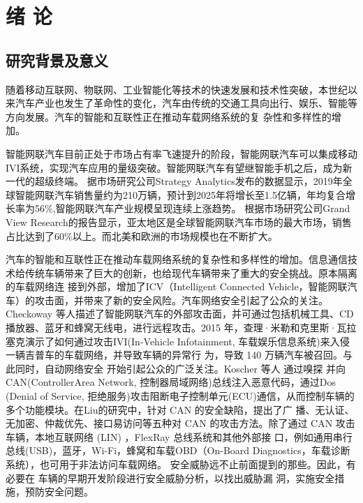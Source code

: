 \chapter{绪\hskip 0.4cm 论}
\label{ch1}
\section{研究背景及意义}
随着移动互联网、物联网、工业智能化等技术的快速发展和技术性突破，本世纪以来汽车产业也发生了革命性的变化，汽车由传统的交通工具向出行、娱乐、智能等方向发展。汽车的智能和互联性正在推动车载网络系统的复
杂性和多样性的增加。

智能网联汽车目前正处于市场占有率飞速提升的阶段，智能网联汽车可以集成移动IVI系统，实现汽车应用的量级突破。智能网联汽车有望继智能手机之后，成为新一代的超级终端。
据市场研究公司Strategy Analytics发布的数据\cite{strategy_analytics_2020}显示，2019年全球智能网联汽车销售量约为210万辆，预计到2025年将增长至1.5亿辆，年均复合增长率为56\%,智能网联汽车产业规模呈现连续上涨趋势。
根据市场研究公司Grand View Research的报告显示\cite{grand_view_research_2020}，亚太地区是全球智能网联汽车市场的最大市场，销售占比达到了60\%以上。而北美和欧洲的市场规模也在不断扩大。

汽车的智能和互联性正在推动车载网络系统的复杂性和多样性的增加。信息通信技术给传统车辆带来了巨大的创新，也给现代车辆带来了重大的安全挑战。原本隔离的车载网络连
接到外部，增加了ICV（Intelligent Connected Vehicle，智能网联汽车）的攻击面，并带来了新的安全风险。汽车网络安全引起了公众的关注。
Checkoway 等人\cite{checkoway2011comprehensive}描述了智能网联汽车的外部攻击面，并可通过包括机械工具、CD播放器、蓝牙和蜂窝无线电，进行远程攻击。2015 年，查理·米勒和克里斯·瓦拉塞克演示了如何通过攻击IVI(In-Vehicle Infotainment, 车载娱乐信息系统)来入侵一辆吉普车的车载网络，并导致车辆的异常行
为，导致 140 万辆汽车被召回。与此同时，自动网络安全
开始引起公众的广泛关注\cite{miller2015remote}。Koscher 等人 \cite{koscher2010experimental} 通过嗅探
并向CAN(ControllerArea Network, 控制器局域网络)总线注入恶意代码，通过Dos
(Denial of Service, 拒绝服务)攻击阻断电子控制单元(ECU)通信，从而控制车辆的
多个功能模块。在Liu的研究\cite{liu2017vehicle}中，针对 CAN 的安全缺陷，提出了广
播、无认证、无加密、仲裁优先、接口易访问等五种对
CAN 的攻击方法。除了通过 CAN 攻击车辆，本地互联网络
(LIN) \cite{deng2017security}，FlexRay \cite{takahashi2017automotive} \cite{gu2016security} 总线系统和其他外部接
口，例如通用串行总线(USB)，蓝牙，Wi-Fi，蜂窝和车载OBD（On-Board Diagnostics，车载诊断系统），也可用于非法访问车载网络\cite{mousa2016lightweight}。
安全威胁远不止前面提到的那些。因此，有必要在
车辆的早期开发阶段进行安全威胁分析，以找出威胁漏
洞，实施安全措施，预防安全问题。

